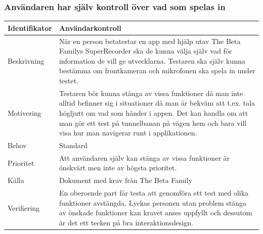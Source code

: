 \subsubsection{Användaren har själv kontroll över vad som spelas in}
\begin{tabular}{ | p{65pt} | p{300pt} |}
  \hline
  Identifikator &
  Användarkontroll
  \\ \hline
  Beskrivning & 
  När en person betatestar en app med hjälp utav The Beta Familys SuperRecorder ska de kunna välja själv vad för information de vill ge utvecklarna. Testaren ska själv kunna bestämma om frontkameran och mikrofonen ska spela in under testet. 
  \\ \hline
  Motivering &
  Testaren bör kunna stänga av vissa funktioner då man inte alltid befinner sig i situationer då man är bekväm att t.ex. tala högljutt om vad som händer i appen. Det kan handla om att man gör ett test på tunnelbanan på vägen hem och bara vill visa hur man navigerar runt i applikationen.
  \\ \hline
  Behov &
  Standard
  \\ \hline
  Prioritet &
  Att användaren själv kan stänga av vissa funktioner är önskvärt men inte av högsta prioritet.
  \\ \hline
  Källa &
  Dokument med krav från The Beta Family
  \\ \hline
  Verifiering &
  En oberoende part får testa att genomföra ett test med olika funktioner avstängda. Lyckas personen utan problem stänga av önskade funktioner kan kravet anses uppfyllt och dessutom är det ett tecken på bra interaktionsdesign.
  \\ \hline
\end{tabular}

